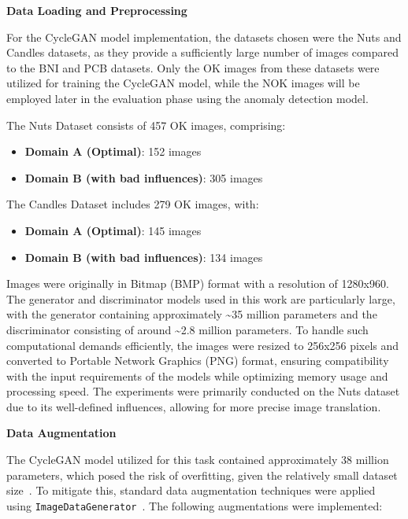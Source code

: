 \documentclass[12pt,DIV14,BCOR12mm,a4paper,footinclude=false,headinclude,parskip=half-,twoside,openright,cleardoublepage=empty,toc=index,bibliography=totoc,listof=totoc]{scrreprt}
\numberwithin{equation}{chapter}
\begin{document}
\textbf{Data Loading and Preprocessing}

For the CycleGAN model implementation, the datasets chosen were the Nuts and Candles datasets, as they provide a sufficiently large number of images compared to the BNI and PCB datasets. Only the OK images from these datasets were utilized for training the CycleGAN model, while the NOK images will be employed later in the evaluation phase using the anomaly detection model.

The Nuts Dataset consists of 457 OK images, comprising:
\begin{itemize}
    \item \textbf{Domain A (Optimal)}: 152 images
    \item \textbf{Domain B (with bad influences)}: 305 images
\end{itemize}

The Candles Dataset includes 279 OK images, with:
\begin{itemize}
    \item \textbf{Domain A (Optimal)}: 145 images
    \item \textbf{Domain B (with bad influences)}: 134 images
\end{itemize}

Images were originally in Bitmap (BMP) format with a resolution of 1280x960. The generator and discriminator models used in this work are particularly large, with the generator containing approximately \textasciitilde 35 million parameters and the discriminator consisting of around \textasciitilde 2.8 million parameters. To handle such computational demands efficiently, the images were resized to 256x256 pixels and converted to Portable Network Graphics (PNG) format, ensuring compatibility with the input requirements of the models while optimizing memory usage and processing speed. The experiments were primarily conducted on the Nuts dataset due to its well-defined influences, allowing for more precise image translation.

\textbf{Data Augmentation}

The CycleGAN model utilized for this task contained approximately 38 million parameters, which posed the risk of overfitting, given the relatively small dataset size~\cite{wang2018transferring}. To mitigate this, standard data augmentation techniques were applied using \texttt{ImageDataGenerator}~\cite{tensorflow_imagedatagenerator}. The following augmentations were implemented:
\end{document}
